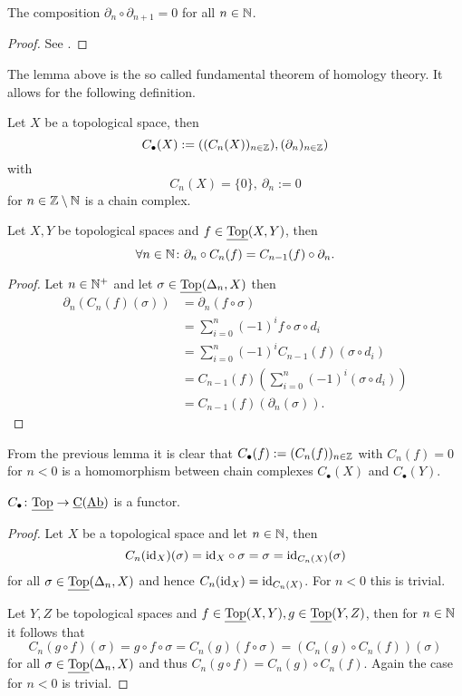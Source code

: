 \begin{lemma}
  The composition $\partial_n \circ \partial_{n+1} = 0$ for all $n \in \mathbb{N}$.
\end{lemma}

\begin{proof}
  See \cite[Theorem 29.1]{MunAlTop}.
\end{proof}

The lemma above is the so called fundamental theorem of homology theory. It allows for the following definition.

\begin{defin}
  Let $X$ be a topological space, then \[C_\bullet(X) := ((C_n(X))_{n\in \mathbb{Z}}), (\partial_n)_{n\in \mathbb{Z}})\] with
  \[C_n(X) = \{0\}, \: \partial_n := 0\] for $n \in \mathbb{Z}\setminus\mathbb{N}$ is a chain complex.
\end{defin}

\begin{lemma}
  Let $X, Y$ be topological spaces and $f \in \underline{\rm Top}(X, Y)$, then \[\forall n\in \mathbb{N}\colon \partial_n \circ C_n(f) = C_{n-1}(f) \circ \partial_n.\]
\end{lemma}

\begin{proof}
  Let $n \in \mathbb{N}^+$ and let $\sigma \in \underline{\rm Top}(\Delta_n, X)$ then
  \begin{align*}
    \partial_n(C_n(f)(\sigma)) &= \partial_n(f\circ\sigma) \\
    &= \sum\limits_{i=0}^n(-1)^if\circ\sigma\circ d_i \\
    &= \sum\limits_{i=0}^n(-1)^iC_{n-1}(f)(\sigma\circ d_i) \\
    &= C_{n-1}(f)(\sum\limits_{i=0}^n(-1)^i(\sigma\circ d_i)) \\
    & = C_{n-1}(f)(\partial_n(\sigma)).
  \end{align*}
\end{proof}

From the previous lemma it is clear that $C_\bullet(f) := (C_n(f))_{n\in \mathbb{Z}}$ with $C_n(f) = 0$ for $n < 0$ is a homomorphism between chain complexes $C_\bullet(X)$ and $C_\bullet(Y)$.

\begin{lemma}\label{lem:cfunc}
  $C_\bullet\colon \underline{\rm Top} \to \underline{\rm C}(\underline{\rm Ab})$ is a functor.
\end{lemma}

\begin{proof}
  Let $X$ be a topological space and let $n \in \mathbb{N}$, then \[C_n({\rm id}_X)(\sigma) = {\rm id}_X\circ \sigma = \sigma = {\rm id}_{C_n(X)}(\sigma)\]
  for all $\sigma \in \underline{\rm Top}(\Delta_n, X)$ and hence $C_n({\rm id}_X) = {\rm id}_{C_n(X)}$.
  For $n < 0$ this is trivial.

  Let $Y, Z$ be topological spaces and $f \in \underline{\rm Top}(X, Y), g\in \underline{\rm Top}(Y, Z)$, then for $n\in \mathbb{N}$ it follows that \[C_n(g\circ f)(\sigma) = g\circ f \circ \sigma = C_n(g)(f\circ \sigma) = (C_n(g) \circ C_n(f))(\sigma)\] for all $\sigma \in \underline{\rm Top}(\Delta_n, X)$ and thus $C_n(g \circ f) = C_n(g) \circ C_n(f)$.
  Again the case for $n < 0$ is trivial.
\end{proof}

